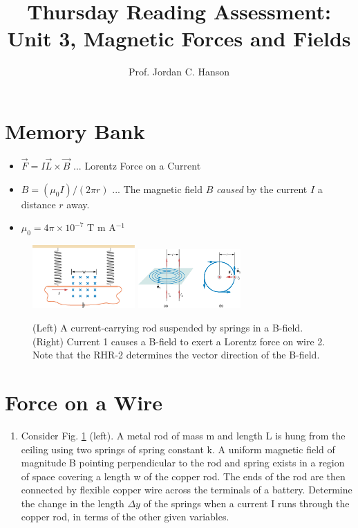 \documentclass{article}
\begin{document}
\title{Thursday Reading Assessment: Unit 3, Magnetic Forces and Fields}
\author{Prof. Jordan C. Hanson}

\maketitle

\section{Memory Bank}

\begin{itemize}
\item $\vec{F} = I \vec{L} \times \vec{B}$ ... Lorentz Force on a Current
\item $B = (\mu_0 I)/(2\pi r)$ ... The magnetic field $B$ \textit{caused} by the current $I$ a distance $r$ away.
\item $\mu_0 = 4\pi \times 10^{-7}$ T m A$^{-1}$
\end{itemize}

\begin{figure}[ht]
\centering
\includegraphics[width=0.35\textwidth]{currentBfieldSpring.jpeg}
\includegraphics[width=0.35\textwidth]{para.jpeg}
\caption{\label{fig:para} (Left) A current-carrying rod suspended by springs in a B-field.  (Right) Current 1 causes a B-field to exert a Lorentz force on wire 2.  Note that the RHR-2 determines the vector direction of the B-field.}
\end{figure}

\section{Force on a Wire}

\begin{enumerate}
\item Consider Fig. \ref{fig:para} (left). A metal rod of mass m and length L is hung from the ceiling using two springs of spring constant k. A uniform magnetic field of magnitude B pointing perpendicular to the rod and spring exists in a region
of space covering a length w of the copper rod. The ends of the rod are then connected by flexible copper wire across the terminals of a battery. Determine the change in the length $\Delta y$ of the springs when a current I runs through the copper rod, in terms of the other given variables. \\ \vspace{2cm}
\end{enumerate}
\end{document}
